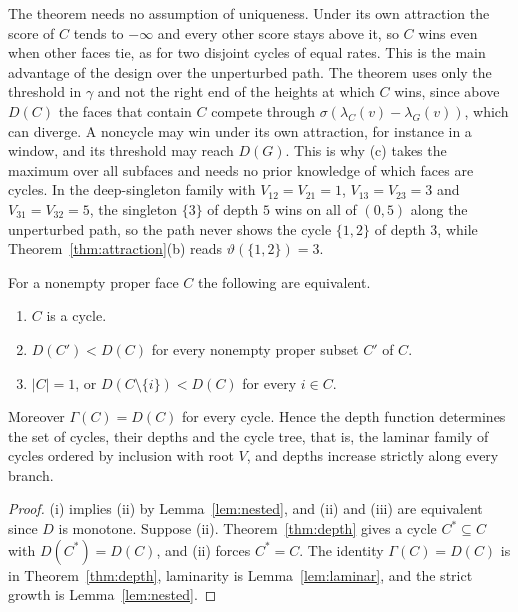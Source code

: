 The theorem needs no assumption of uniqueness. Under its own attraction the
score of $C$ tends to $-\infty$ and every other score stays above it, so $C$
wins even when other faces tie, as for two disjoint cycles of equal rates. This
is the main advantage of the design over the unperturbed path. The theorem
uses only the threshold in $\gamma$ and not the right end of the heights at
which $C$ wins, since above $D(C)$ the faces that contain $C$ compete through
$\sigma(\lambda_C(v)-\lambda_G(v))$, which can diverge. A noncycle may win under its
own attraction, for instance in a window, and its threshold may reach $D(G)$.
This is why (c) takes the maximum over all subfaces and needs no prior
knowledge of which faces are cycles. In the deep-singleton family with
$V_{12}=V_{21}=1$, $V_{13}=V_{23}=3$ and $V_{31}=V_{32}=5$, the singleton
$\{3\}$ of depth $5$ wins on all of $(0,5)$ along the unperturbed path, so the
path never shows the cycle $\{1,2\}$ of depth $3$, while
Theorem~\ref{thm:attraction}(b) reads $\vartheta(\{1,2\})=3$.

\begin{theorem}\label{thm:cycles-from-depths}
For a nonempty proper face $C$ the following are equivalent.
\begin{enumerate}
\item[(i)] $C$ is a cycle.
\item[(ii)] $D(C')<D(C)$ for every nonempty proper subset $C'$ of $C$.
\item[(iii)] $|C|=1$, or $D(C\setminus\{i\})<D(C)$ for every $i\in C$.
\end{enumerate}
Moreover $\Gamma(C)=D(C)$ for every cycle. Hence the depth function determines
the set of cycles, their depths and the cycle tree, that is, the laminar
family of cycles ordered by inclusion with root $V$, and depths increase
strictly along every branch.
\end{theorem}

\begin{proof}
(i) implies (ii) by Lemma~\ref{lem:nested}, and (ii) and (iii) are equivalent
since $D$ is monotone. Suppose (ii). Theorem~\ref{thm:depth} gives a cycle
$C^*\subseteq C$ with $D(C^*)=D(C)$, and (ii) forces $C^*=C$. The identity
$\Gamma(C)=D(C)$ is in Theorem~\ref{thm:depth}, laminarity is
Lemma~\ref{lem:laminar}, and the strict growth is Lemma~\ref{lem:nested}.
\end{proof}


